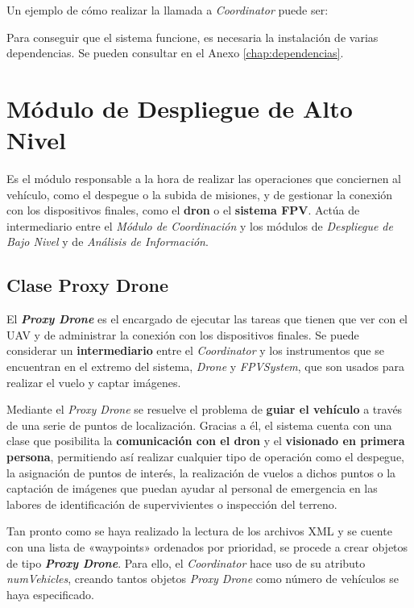 Un ejemplo de cómo realizar la llamada a \textit{Coordinator} puede ser:


Para conseguir que el sistema funcione, es necesaria la instalación de varias dependencias. Se pueden consultar en el Anexo \ref{chap:dependencias}.

\section{Módulo de Despliegue de Alto Nivel}

Es el módulo responsable a la hora de realizar las operaciones que conciernen al vehículo, como el despegue o la subida de misiones, y de gestionar la conexión con los dispositivos finales, como el \textbf{dron} o el \textbf{sistema \acs{FPV}}. Actúa de intermediario entre el \textit{Módulo de Coordinación} y los módulos de \textit{Despliegue de Bajo Nivel} y de \textit{Análisis de Información}.
\subsection{Clase Proxy Drone}

El \textbf{\textit{Proxy Drone}} es el encargado de ejecutar las tareas que tienen que ver con el \acs{UAV} y de administrar la conexión con los dispositivos finales. Se puede considerar un \textbf{intermediario} entre el \textit{Coordinator} y los instrumentos que se encuentran en el extremo del sistema, \textit{Drone} y \textit{FPVSystem}, que son usados para realizar el vuelo y captar imágenes.

Mediante el \textit{Proxy Drone} se resuelve el problema de \textbf{guiar el vehículo} a través de una serie de puntos de localización. Gracias a él, el sistema cuenta con una clase que posibilita la \textbf{comunicación con el dron} y el \textbf{visionado en primera persona}, permitiendo así realizar cualquier tipo de operación como el despegue, la asignación de puntos de interés, la realización de vuelos a dichos puntos o la captación de imágenes que puedan ayudar al personal de emergencia en las labores de identificación de supervivientes o inspección del terreno.

Tan pronto como se haya realizado la lectura de los archivos XML y se cuente con una lista de «waypoints» ordenados por prioridad, se procede a crear objetos de tipo \textbf{\textit{Proxy Drone}}. 
Para ello, el \textit{Coordinator} hace uso de su atributo \textit{numVehicles}, creando tantos objetos \textit{Proxy Drone} como número de vehículos se haya especificado.

